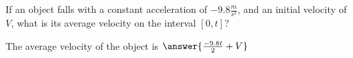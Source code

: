 \documentclass{ximera}
\author{Steven Gubkin}
\begin{document}
\begin{exercise}



If an object falls with a constant acceleration of $-9.8 \frac{m}{s^2}$, and an initial velocity of $V$, what is its average velocity on the interval $[0,t]$?

\begin{prompt}
	The average velocity of the object is $\answer{\frac{-9.8t}{2}+V}$
\end{prompt}
\end{exercise}
\end{document}
